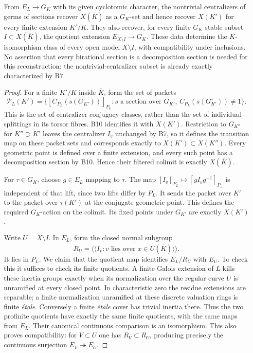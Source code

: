 \documentclass[11pt,a4paper]{article}
\begin{document}
From $E_L\to G_K$ with its given cyclotomic character, the nontrivial
centralizers of germs of sections recover $X(\overline K)$ as a $G_K$-set
and hence recover $X(K')$ for every finite extension $K'/K$.
They also recover, for every finite $G_K$-stable subset
$I\subset X(\overline K)$, the quotient extension
$E_{X\setminus I}\to G_K$. These data determine the $K$-isomorphism
class of every open model $X\setminus I$, with compatibility under
inclusions. No assertion that every birational section is a decomposition
section is needed for this reconstruction: the nontrivial-centralizer
subset is already exactly characterized by B7.

\begin{proof}
For a finite $K'/K$ inside $\overline K$, form the set of packets
\[
 \mathscr P_L(K')=
 \bigl\{[C_{P_L}(s(G_{K'}^\circ))]_{P_L}:
            s\text{ a section over }G_{K'},\ C_{P_L}(s(G_{K'}^\circ))\ne1\bigr\}.
\]
This is the set of centralizer conjugacy classes, rather than the set
of individual splittings in its torsor fibres. B10 identifies it with
$X(K')$. Restriction to $G_{K''}$ for $K''\supset K'$ leaves the
centralizer $I_v$ unchanged by B7, so it defines the transition map on
these packet sets and corresponds exactly to $X(K')\subset X(K'')$.
Every geometric point is defined over a finite extension, and every
such point has a decomposition section by B10. Hence their filtered
colimit is exactly $X(\overline K)$.

For $\tau\in G_K$, choose $g\in E_L$ mapping to $\tau$. The map
$[I_v]_{P_L}\mapsto[gI_vg^{-1}]_{P_L}$ is independent of that lift,
since two lifts differ by $P_L$. It sends the packet over $K'$ to the
packet over $\tau(K')$ at the conjugate geometric point. This defines
the required $G_K$-action on the colimit. Its fixed points under
$G_{K'}$ are exactly $X(K')$.

Write $U=X\setminus I$. In $E_L$, form the closed normal subgroup
\[
 R_U=\overline{\langle\!\langle I_v:
       v\text{ lies over }x\in U(\overline K)\rangle\!\rangle}.
\]
It lies in $P_L$. We claim that the quotient map identifies
$E_L/R_U$ with $E_U$. To check this it suffices to check its finite
quotients. A finite Galois extension of $L$ kills these inertia groups
exactly when its normalization over the regular curve $U$ is unramified
at every closed point. In characteristic zero the residue extensions are
separable; a finite normalization unramified at these discrete valuation
rings is finite \emph{\'etale}. Conversely a finite \emph{\'etale} cover
has trivial inertia there. Thus the two profinite quotients have exactly
the same finite quotients, with the same maps from $E_L$. Their canonical
continuous comparison is an isomorphism. This also proves compatibility:
for $V\subset U$ one has $R_V\subset R_U$, producing precisely the
continuous surjection $E_V\twoheadrightarrow E_U$.


\end{proof}
\end{document}
